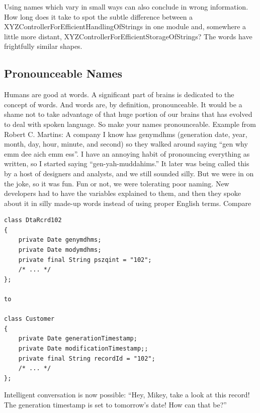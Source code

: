 Using names which vary in small ways can also conclude in wrong information. How long does it take to spot the subtle difference between a XYZControllerForEfficientHandlingOfStrings in one module and, somewhere a little more distant, XYZControllerForEfficientStorageOfStrings? The words have frightfully similar shapes. \citep{Martin-Code-2008}

\subsection{Pronounceable Names}
Humans are good at words. A significant part of brains is dedicated to the concept of words. And words are, by definition, pronounceable. It would be a shame not to take advantage of that huge portion of our brains that has evolved to deal with spoken language. So make your names pronounceable. \citep{Martin-Code-2008}
Example from Robert C. Martins:
A company I know has genymdhms (generation date, year, month, day, hour, minute, and second) so they walked around saying “gen why emm dee aich emm ess”. I have an annoying habit of pronouncing everything as written, so I started saying “gen-yah-muddahims.” It later was being called this by a host of designers and analysts, and we still sounded silly. But we were in on the joke, so it was fun. Fun or not, we were tolerating poor naming. New developers had to have the variables explained to them, and then they spoke about it in silly made-up words instead of using proper English terms. Compare
\begin{lstlisting}[label={list:first}]
class DtaRcrd102
{
    private Date genymdhms;
    private Date modymdhms;
    private final String pszqint = "102";
    /* ... */
};

to

class Customer
{
    private Date generationTimestamp;
    private Date modificationTimestamp;;
    private final String recordId = "102";
    /* ... */
}; 
\end{lstlisting}

Intelligent conversation is now possible: “Hey, Mikey, take a look at this record! The generation timestamp is set to tomorrow’s date! How can that be?”


